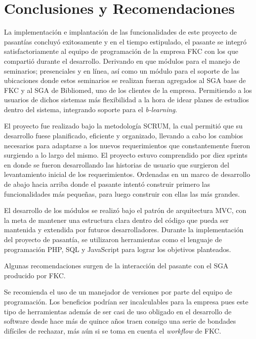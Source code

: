 ﻿\chapter*{Conclusiones y Recomendaciones}
\thispagestyle{empty} %
 

La implementación e implantación de las funcionalidades de este proyecto de pasantías concluyó exitosamente y en el tiempo estipulado, el pasante se integró satisfactoriamente al equipo de programación de la empresa FKC con los que compartió durante el desarrollo. Derivando en que módulos para el manejo de seminarios; presenciales y en línea, así como un módulo para el soporte de las ubicaciones donde estos seminarios se realizan fueran agregados al SGA base de FKC y al SGA de Bibliomed, uno de los clientes de la empresa. Permitiendo a los usuarios de dichos sistemas más flexibilidad a la hora de idear planes de estudios dentro del sistema, integrando soporte para el \emph{b-learning}.

El proyecto fue realizado bajo la metodología SCRUM, la cual permitió que su desarrollo fuese planificado, eficiente y organizado, llevando a cabo los cambios necesarios para adaptarse a los nuevos requerimientos que constantemente fueron surgiendo a lo largo del mismo. El proyecto estuvo comprendido por diez sprints en donde se fueron desarrollando las historias de usuario que surgieron del levantamiento inicial de los requerimientos. Ordenadas en un marco de desarrollo de abajo hacia arriba donde el pasante intentó construir primero las funcionalidades más pequeñas, para luego construir con ellas las más grandes.

El desarrollo de los módulos se realizó bajo el patrón de arquitectura MVC, con la meta de mantener una estructura clara dentro del código que pueda ser mantenida y extendida por futuros desarrolladores. Durante la implementación del proyecto de pasantía, se utilizaron herramientas como el lenguaje de programación PHP, SQL y JavaScript para lograr los objetivos planteados.

Algunas recomendaciones surgen de la interacción del pasante con el SGA producido por FKC.

Se recomienda el uso de un manejador de versiones por parte del equipo de programación. Los beneficios podrían ser incalculables para la empresa pues este tipo de herramientas además de ser casi de uso obligado en el desarrollo de software desde hace más de quince años traen consigo una serie de bondades difíciles de rechazar, más aún si se toma en cuenta el \emph{workflow} de FKC. 

